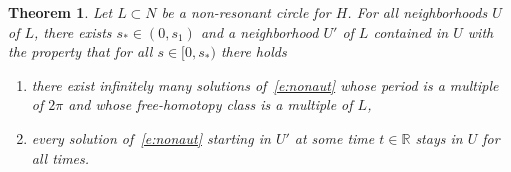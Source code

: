 \documentclass[10pt]{amsart}
\newtheorem{theo}[cdrthm]{Theorem}
\theoremstyle{definition}
\newcommand{\R}{\mathbb{R}}
\begin{document}
\begin{theo}\label{t:Moser}
Let $L\subset N$ be a non-resonant circle for $H$. For all neighborhoods $U$ of $L$, there exists $s_*\in(0,s_1)$ and a neighborhood $U'$ of $L$ contained in $U$ with the property that for all $s\in[0,s_*)$ there holds
\begin{enumerate}
\item\label{theo3.1.1} there exist infinitely many solutions of~\eqref{e:nonaut} whose period is a multiple of $2\pi$ and whose free-homotopy class is a multiple of $L$,
\item\label{theo3.1.2} every solution of~\eqref{e:nonaut} starting in $U'$ at some time $t\in\R$ stays in $U$ for all times.
\end{enumerate}
\end{theo}
\end{document}
